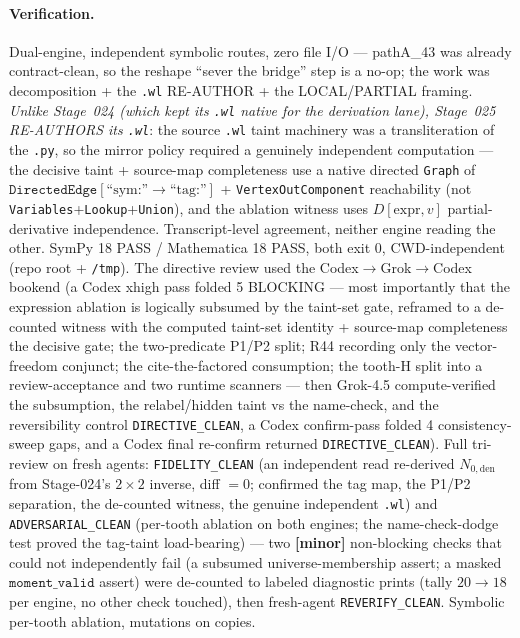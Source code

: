 \paragraph{Verification.}
Dual-engine, independent symbolic routes, zero file I/O --- pathA\_43 was already contract-clean, so the
reshape ``sever the bridge'' step is a no-op; the work was decomposition + the \texttt{.wl} RE-AUTHOR + the
LOCAL/PARTIAL framing. \emph{Unlike Stage~024 (which kept its \texttt{.wl} native for the derivation lane),
Stage~025 RE-AUTHORS its \texttt{.wl}}: the source \texttt{.wl} taint machinery was a transliteration of the
\texttt{.py}, so the mirror policy required a genuinely independent computation --- the decisive taint +
source-map completeness use a native directed \texttt{Graph} of \(\texttt{DirectedEdge}[\text{``sym:''}\to\text{``tag:''}]\)
+ \texttt{VertexOutComponent} reachability (not \texttt{Variables}+\texttt{Lookup}+\texttt{Union}), and the
ablation witness uses \(D[\text{expr},v]\) partial-derivative independence. Transcript-level agreement, neither
engine reading the other. SymPy 18 PASS / Mathematica 18 PASS, both exit 0, CWD-independent (repo root +
\texttt{/tmp}). The directive review used the Codex\(\to\)Grok\(\to\)Codex bookend (a Codex xhigh pass folded
5 BLOCKING --- most importantly that the expression ablation is logically subsumed by the taint-set gate,
reframed to a de-counted witness with the computed taint-set identity + source-map completeness the decisive
gate; the two-predicate P1/P2 split; R44 recording only the vector-freedom conjunct; the cite-the-factored
consumption; the tooth-H split into a review-acceptance and two runtime scanners --- then Grok-4.5
compute-verified the subsumption, the relabel/hidden taint vs the name-check, and the reversibility control
\texttt{DIRECTIVE\_CLEAN}, a Codex confirm-pass folded 4 consistency-sweep gaps, and a Codex final re-confirm
returned \texttt{DIRECTIVE\_CLEAN}). Full tri-review on fresh agents: \texttt{FIDELITY\_CLEAN} (an independent
read re-derived \(N_{0,\mathrm{den}}\) from Stage-024's \(2\times2\) inverse, diff \(=0\); confirmed the tag
map, the P1/P2 separation, the de-counted witness, the genuine independent \texttt{.wl}) and
\texttt{ADVERSARIAL\_CLEAN} (per-tooth ablation on both engines; the name-check-dodge test proved the tag-taint
load-bearing) --- two \textbf{[minor]} non-blocking checks that could not independently fail (a subsumed
universe-membership assert; a masked \(\texttt{moment\_valid}\) assert) were de-counted to labeled diagnostic
prints (tally \(20\to18\) per engine, no other check touched), then fresh-agent \texttt{REVERIFY\_CLEAN}.
Symbolic per-tooth ablation, mutations on copies.
